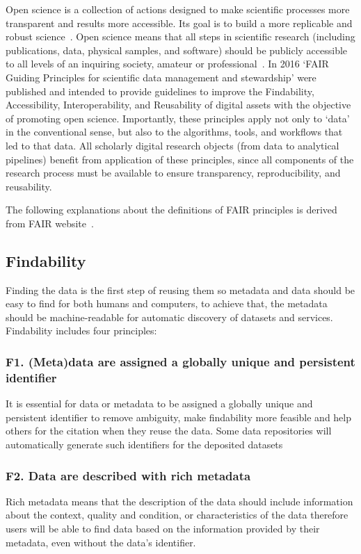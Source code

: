 Open science is a collection of actions designed to make scientific processes more transparent and results more accessible. Its goal is to build a more replicable and robust science~\cite{spellman_gilbert_corker_2017}. Open science means that all steps in scientific research (including publications, data, physical samples, and software) should be publicly accessible to all levels of an inquiring society, amateur or professional~\cite{woelfle2011open}. In 2016 ‘FAIR Guiding Principles for scientific data management and stewardship’ were published and intended to provide guidelines to improve the Findability, Accessibility, Interoperability, and Reusability of digital assets with the objective of promoting open science. Importantly, these principles apply not only to ‘data’ in the conventional sense, but also to the algorithms, tools, and workﬂows that led to that data. All scholarly digital research objects (from data to analytical pipelines) beneﬁt from application of these principles, since all components of the research process must be available to ensure transparency, reproducibility, and reusability.

The following explanations about the definitions of FAIR principles is derived from FAIR website~\cite{FAIR_Principles}.  
\subsection*{Findability}
Finding the data is the first step of reusing them so metadata and data should be easy to find for both humans and computers, to achieve that, the metadata should be machine-readable for automatic discovery of datasets and services.
Findability includes four principles:
\subsubsection*{F1. (Meta)data are assigned a globally unique and persistent identifier}
It is essential for data or metadata to be assigned a globally unique and persistent identifier to remove ambiguity, make findability more feasible and help others for the citation when they reuse the data. Some data repositories will automatically generate such identifiers for the deposited datasets

\subsubsection*{F2. Data are described with rich metadata}
Rich metadata means that the description of the data should include information about the context, quality and condition, or characteristics of the data therefore users will be able to find data based on the information provided by their metadata, even without the data’s identifier.

